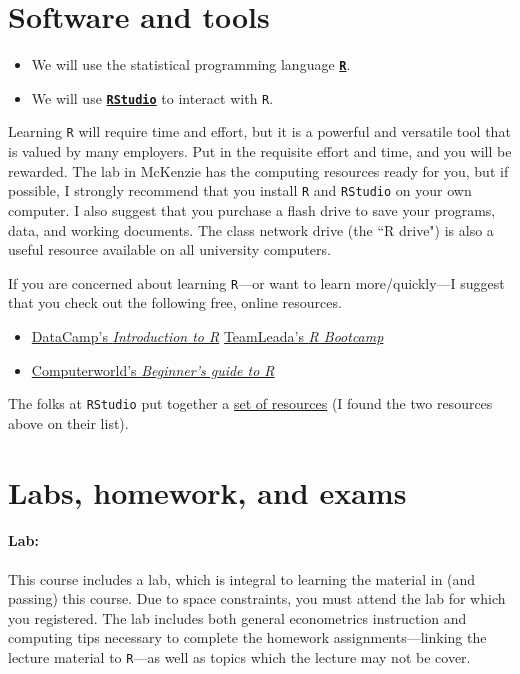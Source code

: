\documentclass[10pt]{article}
\begin{document}
\section*{Software and tools}

\begin{itemize}
  \item We will use the statistical programming language \href{https://www.r-project.org/}{\textbf{\texttt{R}}}.
  \item We will use \href{https://www.rstudio.com}{\textbf{\texttt{RStudio}}} to interact with \texttt{R}.
\end{itemize}
Learning \texttt{R} will require time and effort, but it is a powerful and versatile tool that is valued by many employers. Put in the requisite effort and time, and you will be rewarded. The lab in McKenzie has the computing resources ready for you, but if possible, I strongly recommend that you install \texttt{R} and \texttt{RStudio} on your own computer. I also suggest that you purchase a flash drive to save your programs, data, and working documents. The class network drive (the ``R drive") is also a useful resource available on all university computers.

If you are concerned about learning \texttt{R}---or want to learn more/quickly---I suggest that you check out the following free, online resources.
\begin{itemize}
  \item \href{https://www.datacamp.com/courses/free-introduction-to-r}{DataCamp's \textit{Introduction to R}}
  \href{https://www.teamleada.com/courses/r-bootcamp}{TeamLeada's \textit{R Bootcamp}}
  \item \href{https://www.computerworld.com/article/2497143/business-intelligence-beginner-s-guide-to-r-introduction.html}{Computerworld's \textit{Beginner's guide to R}}
\end{itemize}
The folks at \texttt{RStudio} put together a  \href{https://www.rstudio.com/online-learning/}{set of resources} (I found the two resources above on their list).

\section*{Labs, homework, and exams}

\paragraph{Lab:} This course includes a lab, which is integral to learning the material in (and passing) this course. Due to space constraints, you must attend the lab for which you registered. The lab includes both general econometrics instruction and computing tips necessary to complete the homework assignments---linking the lecture material to \texttt{R}---as well as topics which the lecture may not be cover.
\end{document}
